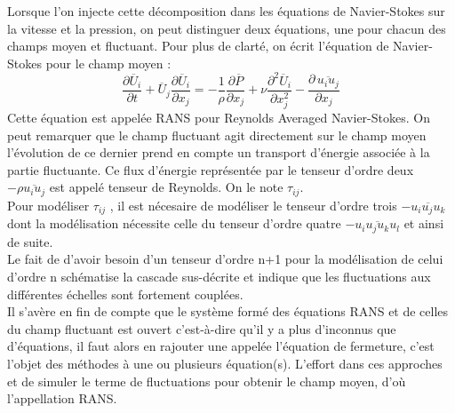 \documentclass[a4paper,12pt]{article}
\newcommand{\cad}{c'est-à-dire}
\newcommand{\NS}{Navier-Stokes}
\newcommand{\taur}{$\tau_{ij}$ }
\numberwithin{equation}{section} %
\begin{document}
Lorsque l'on injecte cette décomposition dans les équations de \NS $ $ sur la vitesse et la pression, on peut distinguer deux équations, une pour chacun des champs moyen et fluctuant. Pour plus de clarté, on écrit l'équation de \NS $ $ pour le champ moyen : 
\begin{equation}
 \frac{\partial \overline{U}_i}{\partial t} + \overline{U}_j \frac{\partial \overline{U}_i}{\partial x_j} = -\frac{1}{\rho} \frac{\partial \overline{P}}{\partial x_j} + \nu \frac{\partial^2 \overline{U}_i}{\partial x_j^2}  - \frac{\partial \, \overline{u_iu_j}}{\partial x_j} \label{meanfield}
 \end{equation}
  Cette équation est appelée RANS pour Reynolds Averaged \NS. On peut remarquer que le champ fluctuant agit directement sur le champ moyen l'évolution de ce dernier prend en compte un transport d'énergie associée à la partie fluctuante. Ce flux d'énergie représentée par le tenseur d'ordre deux $-\rho \overline{u_iu_j}$ est appelé tenseur de Reynolds. On le note $\tau_{ij}$.\\
Pour modéliser \taur, il est nécesaire de modéliser le tenseur d'ordre trois $-\overline{u_iu_ju_k}$ dont la modélisation nécessite celle du tenseur d'ordre quatre $-\overline{u_iu_ju_ku_l}$ et ainsi de suite. \\
Le fait de d'avoir besoin d'un tenseur d'ordre n+1 pour la modélisation de celui d'ordre n schématise la cascade sus-décrite et indique que les fluctuations aux différentes échelles sont fortement couplées.\\
  Il s'avère en fin de compte que le système formé des équations RANS et de celles du champ fluctuant est ouvert \cad $ $ qu'il y a plus d'inconnus que d'équations, il faut alors en rajouter une appelée l'équation de fermeture, c'est l'objet des méthodes à une ou plusieurs équation(s). L'effort dans ces approches et de simuler le terme de fluctuations pour obtenir le champ moyen, d'où l'appellation RANS.\\
  
\end{document}
